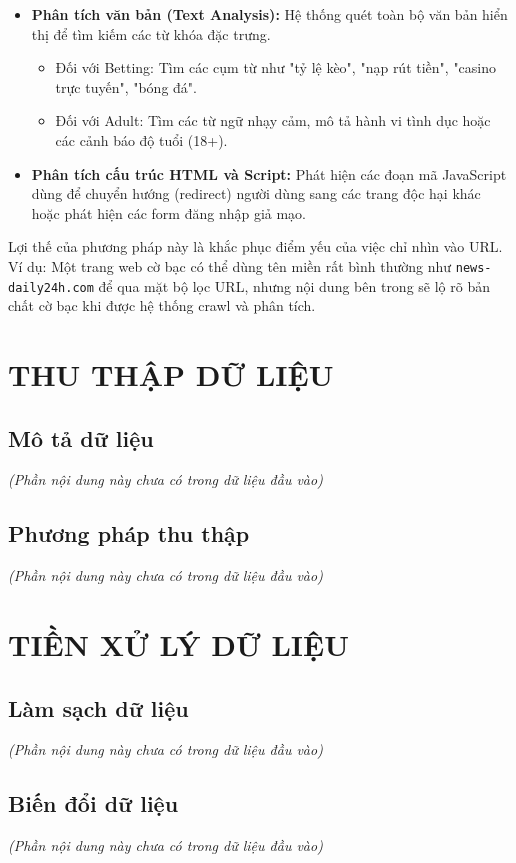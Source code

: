 \documentclass[a4paper,12pt]{report}
\begin{document}
\begin{itemize}
    \item \textbf{Phân tích văn bản (Text Analysis):} Hệ thống quét toàn bộ văn bản hiển thị để tìm kiếm các từ khóa đặc trưng.
    \begin{itemize}
        \item Đối với Betting: Tìm các cụm từ như "tỷ lệ kèo", "nạp rút tiền", "casino trực tuyến", "bóng đá".
        \item Đối với Adult: Tìm các từ ngữ nhạy cảm, mô tả hành vi tình dục hoặc các cảnh báo độ tuổi (18+).
    \end{itemize}
    \item \textbf{Phân tích cấu trúc HTML và Script:} Phát hiện các đoạn mã JavaScript dùng để chuyển hướng (redirect) người dùng sang các trang độc hại khác hoặc phát hiện các form đăng nhập giả mạo.
\end{itemize}

Lợi thế của phương pháp này là khắc phục điểm yếu của việc chỉ nhìn vào URL. Ví dụ: Một trang web cờ bạc có thể dùng tên miền rất bình thường như \texttt{news-daily24h.com} để qua mặt bộ lọc URL, nhưng nội dung bên trong sẽ lộ rõ bản chất cờ bạc khi được hệ thống crawl và phân tích.

\chapter{THU THẬP DỮ LIỆU}
\section{Mô tả dữ liệu}
\textit{(Phần nội dung này chưa có trong dữ liệu đầu vào)}

\section{Phương pháp thu thập}
\textit{(Phần nội dung này chưa có trong dữ liệu đầu vào)}

\chapter{TIỀN XỬ LÝ DỮ LIỆU}
\section{Làm sạch dữ liệu}
\textit{(Phần nội dung này chưa có trong dữ liệu đầu vào)}

\section{Biến đổi dữ liệu}
\textit{(Phần nội dung này chưa có trong dữ liệu đầu vào)}
\end{document}
